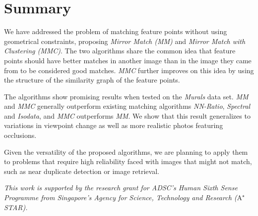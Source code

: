 \documentclass[conference]{IEEEtran}
\begin{document}
\section{Summary}
\label{S:Summary}

We have addressed the problem of matching feature points without using 
geometrical constraints, proposing \emph{Mirror Match 
(MM)} and \emph{Mirror Match with Clustering (MMC)}.  The two algorithms 
share the common idea that feature points should have better 
matches in another image than in the image they came from to be 
considered good matches.  \emph{MMC} further improves on this idea by 
using the structure of the similarity graph of the feature points. 

The algorithms show promising results when tested on the \emph{Murals} 
data set. \emph{MM} and \emph{MMC} generally outperform existing 
matching algorithms \emph{NN-Ratio}, \emph{Spectral} and \emph{Isodata}, 
and \emph{MMC} outperforms \emph{MM}. We show that this result 
generalizes to variations in viewpoint change as well as more realistic 
photos featuring occlusions. 

Given the versatility of the proposed algorithms, we are planning to 
apply them to problems that require high reliability faced with images 
that might not match, such as near duplicate detection or image 
retrieval.

\vspace{2mm}
\textit{This work is supported by the research grant for ADSC's Human 
Sixth Sense Programme from Singapore's Agency for Science, Technology 
and Research ($\text{A}^\star$STAR).}
%


\end{document}
